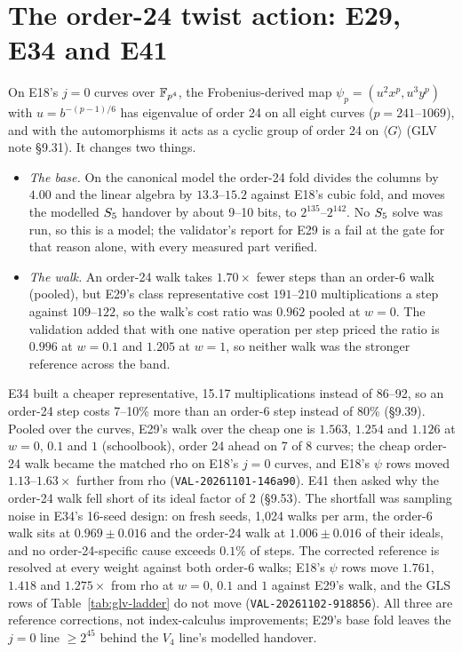 \section{The order-24 twist action: E29, E34 and E41}\label{sec:glv-order24}

On E18's $j=0$ curves over $\mathbb{F}_{p^4}$, the Frobenius-derived map
$\psi_p=(u^2x^p,u^3y^p)$ with $u=b^{-(p-1)/6}$ has eigenvalue of order 24 on all
eight curves ($p=241$--$1069$), and with the automorphisms it acts as a cyclic
group of order 24 on $\langle G\rangle$ (GLV note \S9.31). It changes two things.
\begin{itemize}
\item \emph{The base.} On the canonical model the order-24 fold divides the
  columns by $4.00$ and the linear algebra by $13.3$--$15.2$ against E18's cubic
  fold, and moves the modelled $S_{5}$ handover by about 9--10 bits, to
  $2^{135}$--$2^{142}$. No $S_{5}$ solve was run, so this is a model; the
  validator's report for E29 is a fail at the gate for that reason alone,
  with every measured part verified.
\item \emph{The walk.} An order-24 walk takes $1.70\times$ fewer steps than an
  order-6 walk (pooled), but E29's class representative cost $191$--$210$
  multiplications a step against $109$--$122$, so the walk's cost ratio was
  $0.962$ pooled at $w=0$. The validation added that with one native
  operation per step priced the ratio is $0.996$ at $w=0.1$ and $1.205$ at $w=1$,
  so neither walk was the stronger reference across the band.
\end{itemize}
E34 built a cheaper representative, 15.17 multiplications instead of 86--92,
so an order-24 step costs 7--10\% more than an order-6 step instead of 80\%
(\S9.39). Pooled over the curves, E29's walk over the cheap one is $1.563$,
$1.254$ and $1.126$ at $w=0$, $0.1$ and $1$ (schoolbook), order 24 ahead on 7 of 8
curves; the cheap order-24 walk became the matched rho on E18's $j=0$ curves,
and E18's $\psi$ rows moved $1.13$--$1.63\times$ further from rho
(\texttt{VAL-20261101-146a90}). E41 then asked why the order-24 walk fell short of
its ideal factor of 2 (\S9.53). The shortfall was sampling noise in E34's 16-seed
design: on fresh seeds, 1{,}024 walks per arm, the order-6 walk sits at $0.969\pm0.016$
and the order-24 walk at $1.006\pm0.016$ of their ideals, and no order-24-specific
cause exceeds $0.1\%$ of steps. The corrected reference is resolved at every
weight against both order-6 walks; E18's $\psi$ rows move $1.761$, $1.418$ and
$1.275\times$ from rho at $w=0$, $0.1$ and $1$ against E29's walk, and the GLS rows
of Table~\ref{tab:glv-ladder} do not move (\texttt{VAL-20261102-918856}). All three
are reference corrections, not index-calculus improvements; E29's base fold
leaves the $j=0$ line $\ge2^{45}$ behind the $V_4$ line's modelled handover.

